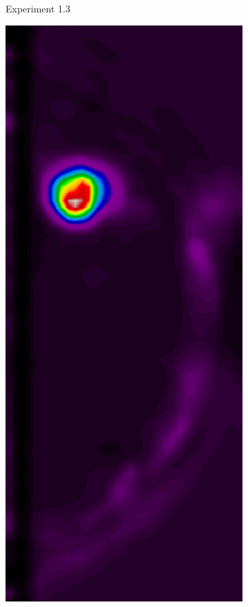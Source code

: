 \begin{figure}[h!]
\begin{subfigure}{0.195\textwidth}
		\caption{Experiment 1.3}
    \end{subfigure}
	\begin{subfigure}{0.195\textwidth}
		\centering
			\includegraphics[width=\textwidth]{plots/examples/example2_probs_2.png}

\end{subfigure}
\end{figure}
